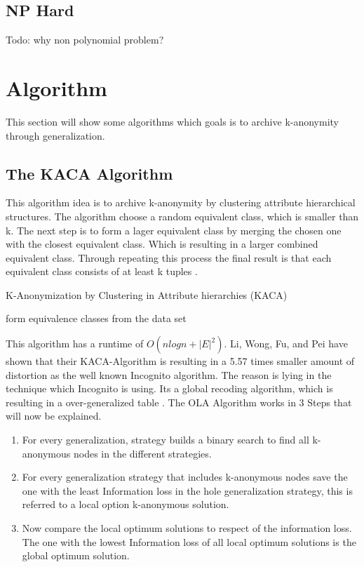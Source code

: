 \documentclass{llncs}
\begin{document}
\subsection{NP Hard}
Todo: why non polynomial problem?
\section{Algorithm}
This section will show some algorithms which goals is to archive k-anonymity through generalization. 

\subsection{The KACA Algorithm}
This algorithm idea is to archive k-anonymity by clustering attribute hierarchical structures. The algorithm choose a random equivalent class, which is smaller than k. The next step is to form a lager equivalent class by merging the chosen  one with the closest equivalent class. Which is resulting in a larger combined equivalent class. Through repeating this process the final result is that each equivalent class consists of at least k tuples  \cite{li2006achieving}.\\
\begin{algorithm}[H]
	\caption{K-Anonymization by Clustering in Attribute hierarchies (KACA) \cite{li2006achieving}}
	form equivalence classes from the data set\\
\end{algorithm}
This algorithm has a runtime of $O(nlogn + |E|^{2})$. Li, Wong, Fu, and Pei have shown that their KACA-Algorithm is resulting in a 5.57 times smaller amount of distortion as the well known Incognito algorithm. The reason is lying in the technique which Incognito is using. Its a global recoding algorithm, which is resulting in a over-generalized table \cite{li2006achieving}.
The OLA Algorithm works in 3 Steps that will now be explained.
\begin{enumerate}
	\item For every generalization, strategy builds a binary search to find all k-anonymous nodes in the different strategies.
	\item For every generalization strategy that includes k-anonymous nodes save the one with the least Information loss in the hole generalization strategy, this is referred to a local option k-anonymous solution.
	\item Now compare the local optimum solutions to respect of the information loss. The one with the lowest Information loss of all local optimum solutions is the global optimum solution.
\end{enumerate}
\end{document}
